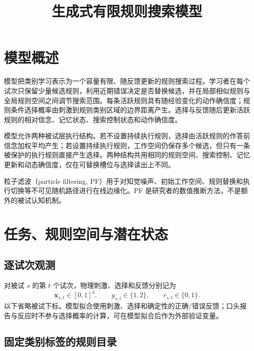 \documentclass[12pt]{article}
\title{生成式有限规则搜索模型}
\author{}
\date{}
\begin{document}
\maketitle

\section{模型概述}

模型把类别学习表示为一个容量有限、随反馈更新的规则搜索过程。学习者在每个试次只保留少量候选规则，利用近期错误决定是否替换候选，并在局部相似规则与全局规则空间之间调节搜索范围。每条活跃规则具有随经验变化的动作确信度；规则条件选择概率由刺激到规则类别区域的边界距离产生。选择与反馈随后更新活跃规则的相对信念、记忆状态、搜索控制状态和动作确信度。

模型允许两种被试层执行结构。若不设置持续执行规则，选择由活跃规则的作答前信念加权平均产生；若设置持续执行规则，工作空间仍保存多个候选，但只有一条被保护的执行规则直接产生选择。两种结构共用相同的规则空间、搜索控制、记忆更新和动态确信度，仅在可替换槽位与选择读出上不同。

粒子滤波（particle filtering, PF）用于对知觉噪声、初始工作空间、规则替换和执行切换等不可见随机路径进行在线边缘化。PF 是研究者的数值推断方法，不是额外的被试认知机制。

\section{任务、规则空间与潜在状态}

\subsection{逐试次观测}

对被试 $s$ 的第 $t$ 个试次，物理刺激、选择和反馈分别记为
\begin{equation}
\bm x_{s,t}\in[0,1]^4,
\qquad
y_{s,t}\in\{1,2\},
\qquad
r_{s,t}\in\{0,1\}.
\label{eq:observations}
\end{equation}
以下省略被试下标。模型拟合使用刺激、选择和确定性的正确/错误反馈；口头报告与反应时不参与选择概率的计算，可在模型拟合后作为外部验证变量。

\subsection{固定类别标签的规则目录}
\end{document}

